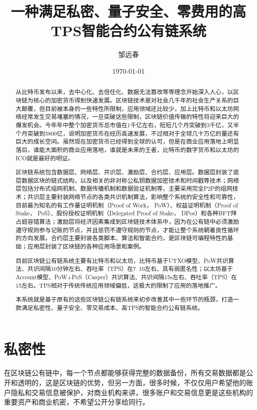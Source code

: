 \documentclass[UTF8]{ctexart}
\title{一种满足私密、量子安全、零费用的高TPS智能合约公有链系统} \author{邹远春} \date{\today}
\begin{document}
\maketitle \tableofcontents

\begin{abstract}

从比特币发布以来，去中心化、去信任化、数据无法篡改等等理念开始深入人心，以区块链为核心的加密货币得到快速发展。区块链技术是对社会几千年的社会生产关系的巨大颠覆，但目前被本身的一些特性所限制，应用领域还比较少，加上比特币和以太坊网络经常发生交易堵塞的情况，一旦突破这些限制，区块链价值传输的特性将迎来巨大的爆发机会。今年年中整个加密货币总市值在1千亿左右，短短几个月突破到3千亿，又半个月突破到5800亿，说明加密货币在经历高速发展，不过相对于全球几十万亿的量还有巨大的成长空间。虽然现在加密货币已经得到全球的认可，但是在商业应用落地上明显落后，谁能大面积的商业应用落地，谁就是未来的王者，比特币的数字货币和以太坊的ICO就是最好的明证。

区块链系统包含数据层、网络层、共识层、激励层、合约层、应用层。数据层封装了底层数据区块的链式结构，以及相关的非对称公私钥数据加密技术和时间戳等技术；网络层包括分布式组网机制、数据传播机制和数据验证机制等，主要采用完全P2P的组网技术；共识层主要封装网络节点的各类共识机制算法，影响整个系统的安全性和可靠性，目前最为知名的有工作量证明机制（Proof of Work， PoW）、权益证明机制（Proof of Stake， PoS）、股份授权证明机制（Delegated Proof of Stake， DPos）和各种BFT拜占庭容错算法；激励层将经济因素集成到区块链技术体系中，因为在公有链中必须激励遵守规则参与记账的节点，并且惩罚不遵守规则的节点，才能让整个系统朝着良性循环的方向发展。合约层主要封装各类脚本、算法和智能合约，是区块链可编程特性的基础；应用层封装了区块链的各种应用场景和案例。

目前区块链公有链系统主要有比特币和以太坊，比特币基于UTXO模型、PoW共识算法、共识间隔10分钟左右、吞吐率（TPS）在7~10左右、具有弱匿名性；以太坊基于Account模型、PoW+PoS（Casper）共识算法、共识间隔15s左右、吞吐率（TPS）在15左右。TPS相对于传统传统应用领域偏低，这极大的限制了应用的落地推广。

本系统就是基于原有的这些区块链公有链系统来初步改善其中一些环节的瓶颈，打造一款满足私密性、量子安全、零交易成本、高TPS的智能合约公有链系统。

\end{abstract}

\section{私密性}

在区块链公有链中，每一个节点都能够获得完整的数据备份，所有交易数据都是公开和透明的，这是区块链的优势，但另一方面，很多时候，不仅仅用户希望他的账户隐私和交易信息被保护，对商业机构来讲，很多账户和交易信息更是这些机构的重要资产和商业机密，不希望公开分享给同行。
\end{document}
